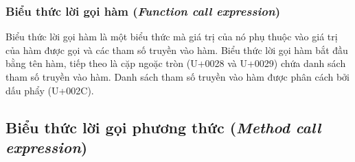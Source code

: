 \subsubsection{Biểu thức lời gọi hàm (\textit{Function call expression})}

\regexfuncallexpr

Biểu thức lời gọi hàm là một biểu thức mà giá trị của nó phụ thuộc vào giá trị của hàm được gọi và các tham số truyền vào hàm. Biểu thức lời gọi hàm bắt đầu bằng tên hàm, tiếp theo là cặp ngoặc tròn (U+0028 và U+0029) chứa danh sách tham số truyền vào hàm. Danh sách tham số truyền vào hàm được phân cách bởi dấu phẩy (U+002C).

\subsection{Biểu thức lời gọi phương thức (\textit{Method call expression})}
